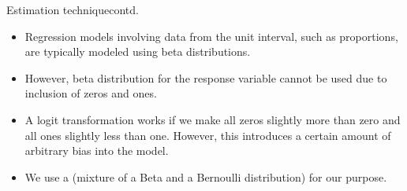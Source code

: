\documentclass{beamer}
\begin{document}
\begin{frame}{Estimation technique}{contd.}
	\begin{itemize}
		\item{Regression models involving data from the unit interval, such as proportions, are typically modeled using beta distributions.}\newline
		\item{However, beta distribution for the response variable cannot be used due to inclusion of zeros and ones.}\newline
		\item{A logit transformation works if we make all zeros slightly more than zero and all ones slightly less than one.  However, this introduces a certain amount of arbitrary bias into the model.}\newline
		
		\item{We use a {\color{blue}{zero-and-one inflated beta distribution model}} (mixture of a Beta and a Bernoulli distribution) for our purpose.}
		\end{itemize}
\end{frame}
		
\end{document}
